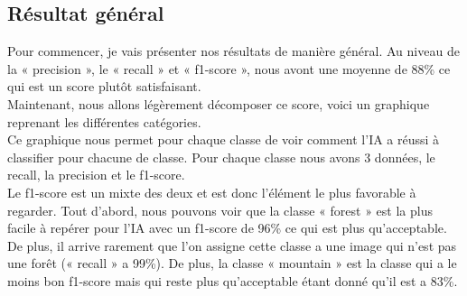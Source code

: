 \documentclass[12pt ,a4paper ]{article}
\begin{document}
\begin{multicols}{2}
\subsection{Résultat général}
Pour commencer, je vais présenter nos résultats de manière général. Au niveau de la « precision », le « recall » et « f1-score », nous avont une moyenne de 88\% ce qui est un score plutôt satisfaisant.\\
Maintenant, nous allons légèrement décomposer ce score, voici un graphique reprenant les différentes catégories.\\
Ce graphique nous permet pour chaque classe de voir comment l’IA a réussi à classifier pour chacune de classe. Pour chaque classe nous avons 3 données, le recall, la precision et le f1-score.\\
Le f1-score est un mixte des deux et est donc l’élément le plus favorable à regarder.
Tout d’abord, nous pouvons voir que la classe « forest » est la plus facile à repérer pour l’IA avec un f1-score de 96\% ce qui est plus qu’acceptable. De plus, il arrive rarement que l’on assigne cette classe a une image qui n’est pas une forêt (« recall » a 99\%).
De plus, la classe « mountain » est la classe qui a le moins bon f1-score mais qui reste plus qu’acceptable étant donné qu’il est a 83\%. \\
\end{multicols}
\end{document}
